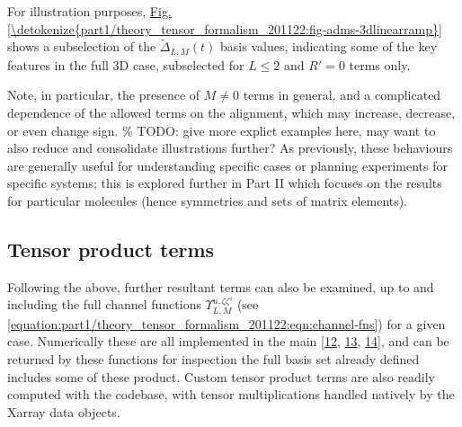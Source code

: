 \documentclass[letterpaper,table,10pt,english]{jupyterBook}
\begin{document}
\sphinxAtStartPar
For illustration purposes, \hyperref[\detokenize{part1/theory_tensor_formalism_201122:fig-adms-3dlinearramp}]{Fig.\@ \ref{\detokenize{part1/theory_tensor_formalism_201122:fig-adms-3dlinearramp}}} shows a subselection of the \(\tilde{\Delta}_{L,M}(t)\) basis values, indicating some of the key features in the full 3D case, subselected for \(L\leq2\) and \(R'=0\) terms only.

\sphinxAtStartPar
Note, in particular, the presence of \(M\neq0\) terms in general, and a complicated dependence of the allowed terms on the alignment, which may increase, decrease, or even change sign. \% TODO: give more explict examples here, may want to also reduce and consolidate illustrations further?
As previously, these behaviours are generally useful for understanding specific cases or planning experiments for specific systems; this is explored further in Part II which focuses on the results for particular molecules (hence symmetries and sets of matrix elements).


\subsection{Tensor product terms}
\label{\detokenize{part1/theory_tensor_formalism_201122:tensor-product-terms}}\label{\detokenize{part1/theory_tensor_formalism_201122:sec-theory-tensor-products}}
\sphinxAtStartPar
Following the above, further resultant terms can also be examined, up to and including the full channel functions \(\varUpsilon_{L,M}^{u,\zeta\zeta'}\) (see \eqref{equation:part1/theory_tensor_formalism_201122:eqn:channel-fns}) for a given case. Numerically these are all implemented in the main  {[}\hyperlink{cite.backmatter/bibliography:id605}{12}, \hyperlink{cite.backmatter/bibliography:id547}{13}, \hyperlink{cite.backmatter/bibliography:id545}{14}{]}, and can be returned by these functions for inspection \sphinxhyphen{} the full basis set already defined includes some of these product. Custom tensor product terms are also readily computed with the codebase, with tensor multiplications handled natively by the Xarray data objects.
\end{document}
